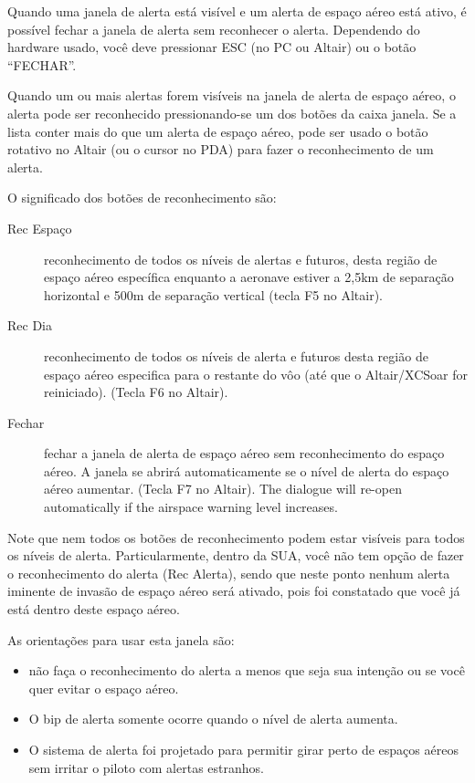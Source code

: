 Quando uma janela de alerta está visível e um alerta de espaço aéreo está ativo, é possível fechar a janela de alerta sem reconhecer o alerta.  Dependendo do hardware usado, você deve pressionar ESC (no PC ou Altair) ou o botão “FECHAR”.

Quando um ou mais alertas forem visíveis na janela de alerta de espaço aéreo, o alerta pode ser reconhecido pressionando-se um dos botões da caixa janela.  Se a lista conter mais do que um alerta de espaço aéreo, pode ser usado o botão rotativo no Altair (ou o cursor no PDA) para fazer o reconhecimento de um alerta.

O significado dos botões de reconhecimento são:

\begin{description}
\item[Rec Espaço]  reconhecimento de todos os níveis de alertas e futuros, desta região de espaço aéreo específica enquanto a aeronave estiver a 2,5km de separação horizontal e 500m de separação vertical (tecla F5 no Altair).
\item[Rec Dia]  reconhecimento de todos os níveis de alerta e futuros desta região de espaço aéreo especifica para o restante do vôo (até que o Altair/XCSoar for reiniciado).  (Tecla F6 no Altair). 
\item[Fechar]  fechar a janela de alerta de espaço aéreo sem reconhecimento do espaço aéreo.  A janela se abrirá automaticamente se o nível de alerta do espaço aéreo aumentar.  (Tecla F7 no Altair).
  The dialogue will re-open automatically if the airspace warning level increases.
\end{description}

Note que nem todos os botões de reconhecimento podem estar visíveis para todos os níveis de alerta.  Particularmente, dentro da SUA, você não tem opção de fazer o reconhecimento do alerta (Rec Alerta), sendo que neste ponto nenhum alerta iminente de invasão de espaço aéreo será ativado, pois foi constatado que você já está dentro deste espaço aéreo.

As orientações para usar esta janela são:
\begin{itemize}
\item  não faça o reconhecimento do alerta a menos que seja sua intenção ou se você quer evitar o espaço aéreo.
\item O bip de alerta somente ocorre quando o nível de alerta aumenta.
\item O sistema de alerta foi projetado para permitir girar perto de espaços aéreos sem irritar o piloto com alertas estranhos.
\end{itemize}

